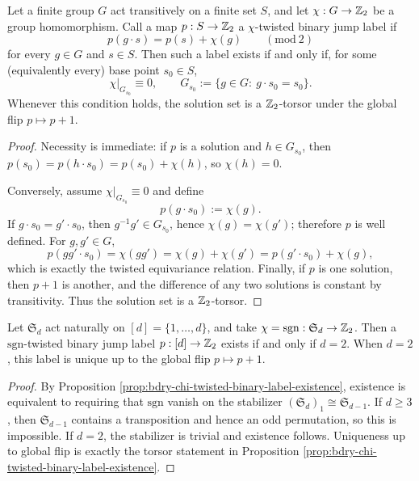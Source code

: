 \begin{proposition}\label{prop:bdry-chi-twisted-binary-label-existence}
Let a finite group \(G\) act transitively on a finite set \(S\), and let \(\chi:G\to\mathbb{Z}_2\) be a group homomorphism.
Call a map \(p:S\to\mathbb{Z}_2\) a \(\chi\)-twisted binary jump label if
\[
p(g\cdot s)=p(s)+\chi(g)\qquad(\mathrm{mod}\ 2)
\]
for every \(g\in G\) and \(s\in S\).
Then such a label exists if and only if, for some (equivalently every) base point \(s_0\in S\),
\[
\chi|_{G_{s_0}}\equiv 0,
\qquad
G_{s_0}:=\{g\in G:\ g\cdot s_0=s_0\}.
\]
Whenever this condition holds, the solution set is a \(\mathbb{Z}_2\)-torsor under the global flip \(p\mapsto p+1\).
\end{proposition}

\begin{proof}
Necessity is immediate: if \(p\) is a solution and \(h\in G_{s_0}\), then
\(
p(s_0)=p(h\cdot s_0)=p(s_0)+\chi(h)
\),
so \(\chi(h)=0\).
\par
Conversely, assume \(\chi|_{G_{s_0}}\equiv 0\) and define
\[
p(g\cdot s_0):=\chi(g).
\]
If \(g\cdot s_0=g'\cdot s_0\), then \(g^{-1}g'\in G_{s_0}\), hence \(\chi(g)=\chi(g')\); therefore \(p\) is well defined.
For \(g,g'\in G\),
\[
p(gg'\cdot s_0)=\chi(gg')=\chi(g)+\chi(g')=p(g'\cdot s_0)+\chi(g),
\]
which is exactly the twisted equivariance relation.
Finally, if \(p\) is one solution, then \(p+1\) is another, and the difference of any two solutions is constant by transitivity.
Thus the solution set is a \(\mathbb{Z}_2\)-torsor. \qedhere
\end{proof}

\begin{corollary}\label{cor:bdry-symmetric-group-sign-twisted-label-d2}
Let \(\mathfrak S_d\) act naturally on \([d]=\{1,\dots,d\}\), and take \(\chi=\mathrm{sgn}:\mathfrak S_d\to\mathbb{Z}_2\).
Then a \(\mathrm{sgn}\)-twisted binary jump label \(p:[d]\to\mathbb{Z}_2\) exists if and only if \(d=2\).
When \(d=2\), this label is unique up to the global flip \(p\mapsto p+1\).
\end{corollary}

\begin{proof}
By Proposition \ref{prop:bdry-chi-twisted-binary-label-existence}, existence is equivalent to requiring that \(\mathrm{sgn}\) vanish on the stabilizer \((\mathfrak S_d)_1\cong \mathfrak S_{d-1}\).
If \(d\ge 3\), then \(\mathfrak S_{d-1}\) contains a transposition and hence an odd permutation, so this is impossible.
If \(d=2\), the stabilizer is trivial and existence follows.
Uniqueness up to global flip is exactly the torsor statement in Proposition \ref{prop:bdry-chi-twisted-binary-label-existence}. \qedhere
\end{proof}

